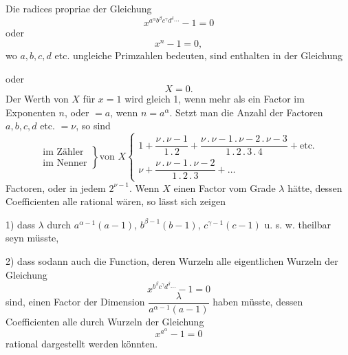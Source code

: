 \NoSourceHead
{}
\noindent\hspace*{\parindent}Die radices propriae der Gleichung
\[x^{a^\alpha b^\beta c^\gamma d^\delta\cdots}-1=0\]
\noindent oder
\[x^n-1=0,\]
\noindent wo $a,b,c,d$ etc. ungleiche Primzahlen bedeuten, sind enthalten in der Gleichung
\begin{center}
\end{center}
\noindent oder
\[X=0.\]
\noindent Der Werth von $X$ für $x=1$ wird gleich 1, wenn mehr als ein Factor im Exponenten
$n$, oder $=a$, wenn $n=a^\alpha$. Setzt man die Anzahl der Factoren $a,b,c,d$ etc. $=\nu$,
so sind
\[
\left.\begin{array}{r}\text{im Zähler}\\[14pt]\text{im Nenner}\end{array}\right\}
\text{von }X
\left\{\begin{array}{l}
1+\dfrac{\nu\mathpunct{.}\nu-1}{1\mathpunct{.}2}+\dfrac{\nu\mathpunct{.}\nu-1\mathpunct{.}\nu-2\mathpunct{.}\nu-3}{1\mathpunct{.}2\mathpunct{.}3\mathpunct{.}4}+\text{etc.}\\[14pt]
\nu+\dfrac{\nu\mathpunct{.}\nu-1\mathpunct{.}\nu-2}{1\mathpunct{.}2\mathpunct{.}3}+\ldots
\end{array}\right.
\]
\noindent Factoren, oder in jedem $2^{\nu-1}$.
\clearpage
{}
\noindent\hspace*{\parindent}Wenn $X$ einen Factor vom Grade $\lambda$ hätte, dessen Coefficienten
alle rational wären, so lässt sich zeigen

1) dass $\lambda$ durch $a^{\alpha-1}(a-1)$, $b^{\beta-1}(b-1)$, $c^{\gamma-1}(c-1)$
u. s. w. theilbar seyn müsste,

2) dass sodann auch die Function, deren Wurzeln alle eigentlichen Wurzeln der Gleichung
\[x^{b^\beta c^\gamma d^\delta\cdots}-1=0\]
\noindent sind, einen Factor der Dimension $\dfrac\lambda{a^{\alpha-1}(a-1)}$ haben müsste,
dessen Coefficienten alle durch Wurzeln der Gleichung
\[x^{a^\alpha}-1=0\]
\noindent rational dargestellt werden könnten.

